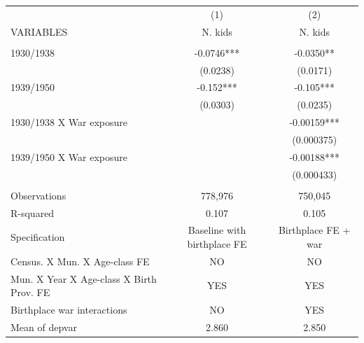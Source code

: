 \begin{tabular}{lcc} \hline
 & (1) & (2) \\
VARIABLES & N. kids & N. kids \\ \hline
 &  &  \\
1930/1938 & -0.0746*** & -0.0350** \\
 & (0.0238) & (0.0171) \\
1939/1950 & -0.152*** & -0.105*** \\
 & (0.0303) & (0.0235) \\
1930/1938 X War exposure &  & -0.00159*** \\
 &  & (0.000375) \\
1939/1950 X War exposure &  & -0.00188*** \\
 &  & (0.000433) \\
 &  &  \\
Observations & 778,976 & 750,045 \\
R-squared & 0.107 & 0.105 \\
Specification & Baseline with birthplace FE & Birthplace FE + war \\
Census. X Mun. X Age-class FE & NO & NO \\
Mun. X Year X Age-class X Birth Prov. FE & YES & YES \\
Birthplace war interactions & NO & YES \\
 Mean of depvar & 2.860 & 2.850 \\ \hline
\end{tabular}
